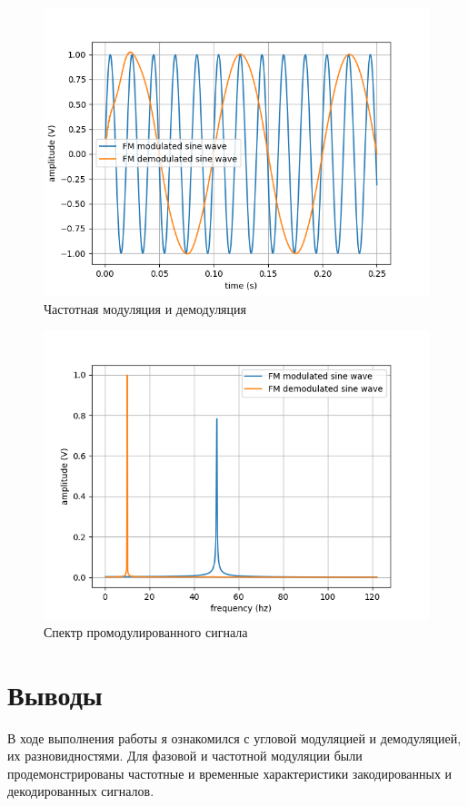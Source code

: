 \begin{figure}[H]
	\begin{center}
		\includegraphics[scale=0.7]{../out/FM_time.png}
		\caption{Частотная модуляция и демодуляция} 
		\label{pic:sine_time_1} %
	\end{center}
\end{figure}

\begin{figure}[H]
	\begin{center}
		\includegraphics[scale=0.7]{../out/FM_frequency.png}
		\caption{Спектр промодулированного сигнала} 
		\label{pic:sine_freq_1} %
	\end{center}
\end{figure}

\newpage
\section{Выводы}
В ходе выполнения работы я ознакомился с угловой модуляцией и демодуляцией, их разновидностями.
Для фазовой и частотной модуляции были продемонстрированы частотные и временные характеристики закодированных и декодированных сигналов.


